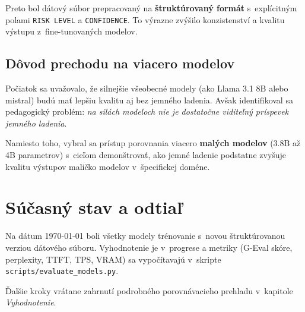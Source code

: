 Preto bol dátový súbor prepracovaný na \textbf{štruktúrovaný formát} s~explícitným polami \texttt{RISK LEVEL} a \texttt{CONFIDENCE}. To výrazne zvýšilo konzistenství a kvalitu výstupu z~fine-tunovaných modelov.

\subsection{Dôvod prechodu na viacero modelov}

Počiatok sa uvažovalo, že silnejšie všeobecné modely (ako Llama 3.1 8B alebo mistral) budú mať lepšiu kvalitu aj bez jemného ladenia. Avšak identifikoval sa pedagogický problém: \emph{na silách modeloch nie je dostatočne viditeľný príspevek jemného ladenia}.

Namiesto toho, vybral sa prístup porovnania viacero \textbf{malých modelov} (3.8B až 4B parametrov) s~cieľom demonštrovať, ako jemné ladenie podstatne zvyšuje kvalitu výstupov maličko modelov v~špecifickej doméne.


\section{Súčasný stav a odtiaľ}

Na dátum \today{} boli všetky modely trénovanie s~novou štruktúrovanou verziou dátového súboru. Vyhodnotenie je v~progrese a metriky (G-Eval skóre, perplexity, TTFT, TPS, VRAM) sa vypočítavajú v~skripte \texttt{scripts/evaluate\_models.py}.

Ďalšie kroky vrátane zahrnutí podrobného porovnávacieho prehladu v~kapitole \textit{Vyhodnotenie}.
